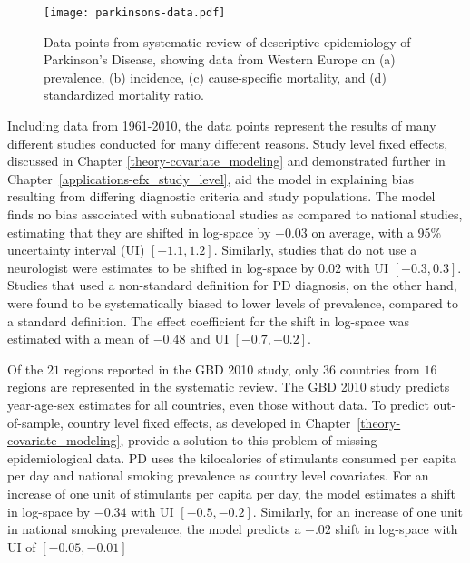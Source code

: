     \begin{figure}[h]
        \begin{center}
            \texttt{[image: parkinsons-data.pdf]}
            \caption{Data points from systematic review of descriptive
              epidemiology of Parkinson's Disease, showing data from
              Western Europe on (a) prevalence, (b) incidence, (c)
              cause-specific mortality, and (d) standardized mortality
              ratio.}
            \label{fig:intro-parkinsons data}
        \end{center}
    \end{figure}

Including data from 1961-2010, the data points represent the results
of many different studies conducted for many different reasons.  Study
level fixed effects, discussed in Chapter
\ref{theory-covariate_modeling} and demonstrated further in
Chapter~\ref{applications-efx_study_level}, aid the model in
explaining bias resulting from differing diagnostic criteria and study
populations.  The model finds no bias associated with subnational
studies as compared to national studies, estimating that they are
shifted in log-space by $-0.03$ on average, with a 95\% uncertainty
interval (UI) $[-1.1, 1.2]$.  Similarly, studies that do not use a
neurologist were estimates to be shifted in log-space by $0.02$ with
UI $[-0.3, 0.3]$.  Studies that used a non-standard definition for PD
diagnosis, on the other hand, were found to be systematically biased
to lower levels of prevalence, compared to a standard definition. The
effect coefficient for the shift in log-space was estimated with a
mean of $-0.48$ and UI $[-0.7, -0.2]$.

Of the $21$ regions reported in the GBD 2010 study, only $36$ countries
from $16$ regions are represented in the systematic review.  The GBD
2010 study predicts year-age-sex estimates for all countries, even
those without data.  To predict out-of-sample, country level fixed
effects, as developed in Chapter~\ref{theory-covariate_modeling}, provide a solution to this
problem of missing epidemiological data.  PD uses the
kilocalories of stimulants consumed per capita per day and national smoking prevalence
as country level covariates.  For an increase of one unit of stimulants per
capita per day, the model estimates a shift in log-space by $-0.34$
with UI $[-0.5, -0.2]$.  Similarly, for an increase of one unit in national
smoking prevalence, the model predicts a $-.02$ shift in log-space with UI
of $[-0.05, -0.01]$

